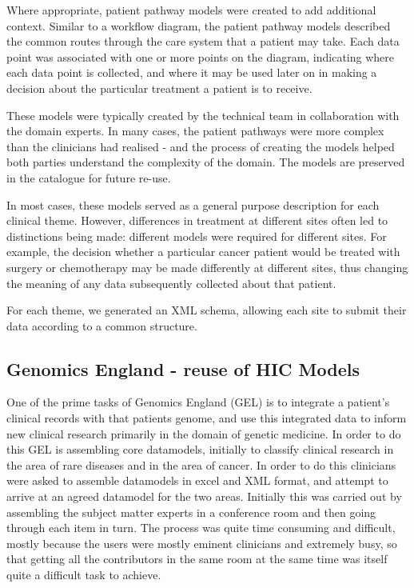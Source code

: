 Where appropriate, patient pathway models were created to add
additional context.  Similar to a workflow diagram, the patient
pathway models described the common routes through the care system
that a patient may take.  Each data point was associated with one or
more points on the diagram, indicating where each data point is
collected, and where it may be used later on in making a decision
about the particular treatment a patient is to receive.

These models were typically created by the technical team in
collaboration with the domain experts.  In many cases, the patient
pathways were more complex than the clinicians had realised - and the
process of creating the models helped both parties understand the
complexity of the domain.  The models are preserved in the catalogue
for future re-use.

In most cases, these models served as a general purpose description
for each clinical theme.  However, differences in treatment at
different sites often led to distinctions being made: different models
were required for different sites.  For example, the decision whether
a particular cancer patient would be treated with surgery or
chemotherapy may be made differently at different sites, thus changing
the meaning of any data subsequently collected about that patient.

For each theme, we generated an XML schema, allowing each site to
submit their data according to a common structure.   


\subsection{Genomics England - reuse of HIC Models}

One of the prime tasks of Genomics England (GEL) is to integrate a patient's clinical records with that patients genome, and use this integrated data to inform new clinical research primarily in the domain of genetic medicine. In order to do this GEL is assembling core datamodels, initially to classify clinical research in the area of rare diseases and in the area of cancer.  In order to do this clinicians were asked to assemble datamodels in excel and XML format, and attempt to arrive at an agreed datamodel for the two areas.  Initially this was carried out by assembling the subject matter experts in a conference room and then going through each item in turn. The process was quite time consuming and difficult, mostly because the users were mostly eminent clinicians and extremely busy, so that getting all the contributors in the same room at the same time was itself quite a difficult task to achieve.

